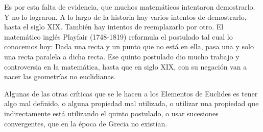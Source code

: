 Es por esta falta de evidencia, que muchos matemáticos intentaron demostrarlo. Y no lo lograron. A lo largo de la historia hay varios intentos de demostrarlo, hasta el siglo XIX. También hay intentos de reemplazarlo por otro. El matemático inglés Playfair (1748-1819) reformula el postulado tal cual lo conocemos hoy: Dada una recta y un punto que no está en ella, pasa una y solo una recta paralela a dicha recta. Ese quinto postulado dio mucho trabajo y controversia en la matemática, hasta que en siglo XIX, con su negación van a nacer las geometrías no euclidianas.

Algunas de las otras críticas que se le hacen a los Elementos de Euclides es tener algo mal definido, o alguna propiedad mal utilizada, o utilizar una propiedad que indirectamente está utilizando el quinto postulado, o usar sucesiones convergentes, que en la época de Grecia no existían.
